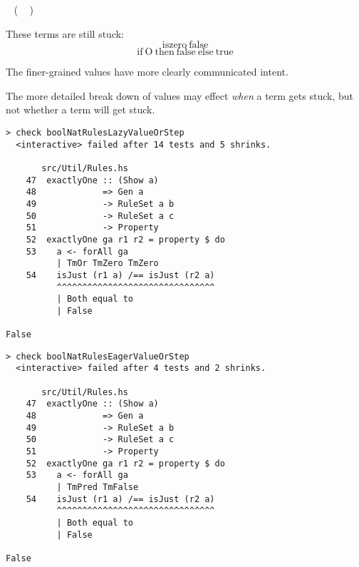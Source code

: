 \begin{frame}
  \begin{mdframed}[frametitle={Small-step semantics}]
  \infrule[E-IsZeroSucc]
        {}
        {~ \left( ~ \right) \longrightarrow {}}
  \end{mdframed}
\end{frame}

\begin{frame}
  These terms are still stuck:
\begin{displaymath}
\text{iszero}~\text{false}
\end{displaymath}
\begin{displaymath}
\text{if}~\text{O}~\text{then}~\text{false}~\text{else}~\text{true}
\end{displaymath}
\end{frame}

\begin{frame}[c]
  The finer-grained values have more clearly communicated intent.
\end{frame}

\begin{frame}[c]
  The more detailed break down of values may effect {\it when} a term gets stuck, but not whether a term will get stuck.
\end{frame}

\begin{frame}[fragile]
  \begin{verbatim}
> check boolNatRulesLazyValueOrStep
  <interactive> failed after 14 tests and 5 shrinks.
  
       src/Util/Rules.hs
    47  exactlyOne :: (Show a)
    48             => Gen a
    49             -> RuleSet a b
    50             -> RuleSet a c
    51             -> Property
    52  exactlyOne ga r1 r2 = property $ do
    53    a <- forAll ga
          | TmOr TmZero TmZero
    54    isJust (r1 a) /== isJust (r2 a)
          ^^^^^^^^^^^^^^^^^^^^^^^^^^^^^^^
          | Both equal to
          | False
  
False
  \end{verbatim}
\end{frame}

\begin{frame}[fragile]
  \begin{verbatim}
> check boolNatRulesEagerValueOrStep
  <interactive> failed after 4 tests and 2 shrinks.
  
       src/Util/Rules.hs
    47  exactlyOne :: (Show a)
    48             => Gen a
    49             -> RuleSet a b
    50             -> RuleSet a c
    51             -> Property
    52  exactlyOne ga r1 r2 = property $ do
    53    a <- forAll ga
          | TmPred TmFalse
    54    isJust (r1 a) /== isJust (r2 a)
          ^^^^^^^^^^^^^^^^^^^^^^^^^^^^^^^
          | Both equal to
          | False
  
False
  \end{verbatim}
\end{frame}

